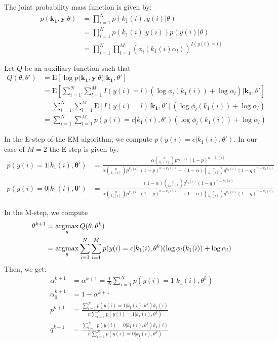 The joint probability mass function is given by:
\begin{align*}
p(\mathbf{k_1}, \mathbf{y} | \theta ) &= \prod_{i=1}^{N} p(k_1(i), y(i) | \theta ) \\
&= \prod_{i=1}^{N} p(k_1(i) | y(i) ) p(y(i) | \theta )  \\
&= \prod_{i=1}^{N} \prod_{l=1}^{M} (\phi_l(k_1(i) \alpha_l)) ^ {I(y(i)=l)}
\end{align*}

Let $Q$ be an auxiliary function such that
\begin{align*}
Q(\theta, \theta') &= \mathrm{E} \left[ \log p(\mathbf{k_1}, \mathbf{y} | \theta ) | \mathbf{k_1}, \theta' \right] \\
&= \mathrm{E} \left[ \sum_{i=1}^{N} \sum_{l=1}^{M} I(y(i)=l) (\log \phi_l(k_1(i)) + \log \alpha_l) | \mathbf{k_1}, \theta' \right] \\
&= \sum_{i=1}^{N} \sum_{l=1}^{M} \mathrm{E} \left[ I(y(i)=l) | \mathbf{k_1}, \theta' \right] (\log \phi_l(k_1(i)) + \log \alpha_l)  \\
&= \sum_{i=1}^{N} \sum_{l=1}^{M} p(y(i) = c | k_1(i), \theta') (\log \phi_l(k_1(i)) + \log \alpha_l)
\end{align*}

In the E-step of the EM algorithm, we compute $p(y(i) = c | k_1(i), \theta')$. 
In our case of $M=2$ the E-step is given by:
\begin{align*}
p(y(i) = 1 | k_1(i), \mathbf{\theta'}) &= \frac{\alpha \binom{n}{k_1(i)} p^{k_1(i)} (1-p)^{n-k_1(i)}}{\alpha \binom{n}{k_1(i)} p^{k_1(i)} (1-p)^{n-k_1(i)} + (1-\alpha) \binom{n}{k_1(i)} q^{k_1(i)} (1-q)^{n-k_1(i)}} \\
p(y(i) = 0 | k_1(i), \mathbf{\theta'}) &= \frac{(1-\alpha) \binom{n}{k_1(i)} q^{k_1(i)} (1-q)^{n-k_1(i)}}{\alpha \binom{n}{k_1(i)} p^{k_1(i)} (1-p)^{n-k_1(i)} + (1-\alpha) \binom{n}{k_1(i)} q^{k_1(i)} (1-q)^{n-k_1(i)}}
\end{align*}

In the M-step, we compute
\begin{align*}
\theta^{k+1} &= \operatorname*{\arg\!\max}_\theta Q(\theta, \theta^{k}) \\
&= \operatorname*{\arg\!\max}_\theta \sum_{i=1}^{N} \sum_{l=1}^{M} p(y(i) = c | k_1(i), \theta^{k}) (\log \phi_l(k_1(i)) + \log \alpha_l)
\end{align*}
Then, we get:
\begin{align*}
\alpha_1^{k+1} &= \alpha^{k+1} = \frac{1}{N} \sum_{i=1}^{N} p(y(i) = 1 | k_1(i), \theta^{k}) \\
\alpha_0^{k+1} &= 1 - \alpha^{k+1} \\
p^{k+1} &= \frac{\sum_{i=1}^{N} p(y(i) = 1 | k_1(i), \theta^{k}) k_1(i)}{n \sum_{i=1}^{N} p(y(i) = 1 | k_1(i), \theta^{k})} \\
q^{k+1} &= \frac{\sum_{i=1}^{N} p(y(i) = 0 | k_1(i), \theta^{k}) k_1(i)}{n \sum_{i=1}^{N} p(y(i) = 0 | k_1(i), \theta^{k})}
\end{align*}

